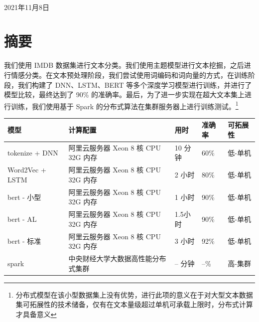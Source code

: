 \documentclass[
  hyperref,]{ctexart}
\begin{document}
\begin{titlepage}
\begin{minipage}{0.4\textwidth}
\end{minipage}\\[2cm]



{\large 2021年11月8日}\\[2cm] %

\vfill %

\end{titlepage}
\tableofcontents

\newpage

\hypertarget{ux6458ux8981}{%
\section{摘要}\label{ux6458ux8981}}

我们使用 IMDB
数据集进行文本分类。我们使用主题模型进行文本挖掘，之后进行情感分类。在文本预处理阶段，我们尝试使用词编码和词向量的方式，在训练阶段，我们构建了
DNN、LSTM、BERT 等多个深度学习模型进行训练，并进行了模型比较，最终达到了
90\% 的准确率。最后，为了进一步实现在超大文本集上进行训练，我们使用基于
Spark 的分布式算法在集群服务器上进行训练测试。\footnote{分布式模型在该小型数据集上没有优势，进行此项的意义在于对大型文本数据集可拓展性的技术储备，仅有在文本量级超过单机可承载上限时，分布式计算才具备意义}

\begin{longtable}[]{@{}lllll@{}}
\toprule
模型 & 计算配置 & 用时 & 准确率 & 可拓展性 \\
\midrule
\endhead
tokenize + DNN & 阿里云服务器 Xeon 8 核 CPU 32G 内存 & 10 分钟 & 60\% &
低-单机 \\
Word2Vec + LSTM & 阿里云服务器 Xeon 8 核 CPU 32G 内存 & 2 小时 & 80\% &
低-单机 \\
bert - 小型 & 阿里云服务器 Xeon 8 核 CPU 32G 内存 & 1 小时 & 90\% &
低-单机 \\
bert - AL & 阿里云服务器 Xeon 8 核 CPU 32G 内存 & 1.5小时 & 90\% &
低-单机 \\
bert - 标准 & 阿里云服务器 Xeon 8 核 CPU 32G 内存 & 3 小时 & 92\% &
低-单机 \\
spark & 中央财经大学大数据高性能分布式集群 & -- 分钟 & --\% & 高-集群 \\
\bottomrule
\end{longtable}
\end{document}
